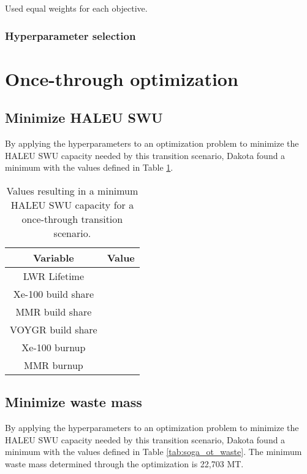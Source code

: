 Used equal weights for each objective. 

\subsubsection{Hyperparameter selection}

\section{Once-through optimization}
\subsection{Minimize HALEU SWU}
By applying the hyperparameters to an optimization problem to minimize the 
\gls{HALEU} \gls{SWU} capacity needed by this transition scenario, Dakota
found a minimum with the values defined in Table \ref{tab:soga_ot_haleu}.

\begin{table}
    \centering 
    \caption{Values resulting in a minimum \gls{HALEU} \gls{SWU} capacity for 
              a once-through transition scenario.}
    \label{tab:soga_ot_haleu}
    \begin{tabular}{c c}
        \hline
        Variable & Value \\
        \hline
        LWR Lifetime & \\
        Xe-100 build share & \\
        MMR build share & \\
        VOYGR build share & \\
        Xe-100 burnup & \\
        MMR burnup & \\
        \hline
    \end{tabular}
\end{table}

\subsection{Minimize waste mass}
By applying the hyperparameters to an optimization problem to minimize the 
\gls{HALEU} \gls{SWU} capacity needed by this transition scenario, Dakota
found a minimum with the values defined in Table \ref{tab:soga_ot_waste}.
The minimum waste mass determined through the optimization is 22,703 MT. 


